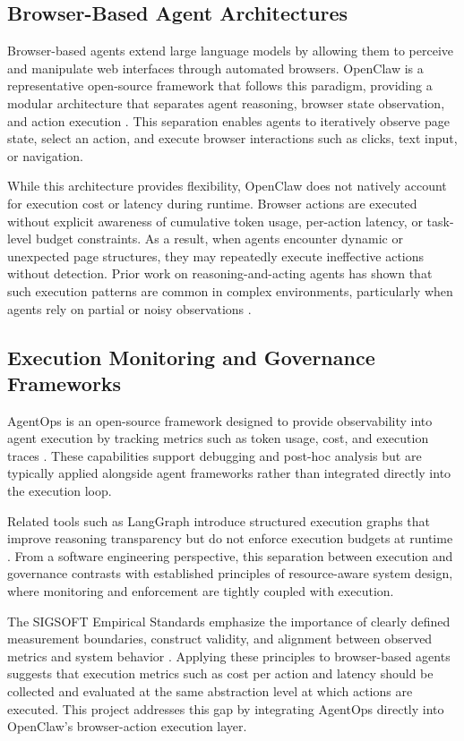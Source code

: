 \documentclass[conference]{IEEEtran}
\begin{document}
\subsection{Browser-Based Agent Architectures}

Browser-based agents extend large language models by allowing them to perceive and manipulate web interfaces through automated browsers. OpenClaw is a representative open-source framework that follows this paradigm, providing a modular architecture that separates agent reasoning, browser state observation, and action execution \cite{openclaw}. This separation enables agents to iteratively observe page state, select an action, and execute browser interactions such as clicks, text input, or navigation.

While this architecture provides flexibility, OpenClaw does not natively account for execution cost or latency during runtime. Browser actions are executed without explicit awareness of cumulative token usage, per-action latency, or task-level budget constraints. As a result, when agents encounter dynamic or unexpected page structures, they may repeatedly execute ineffective actions without detection. Prior work on reasoning-and-acting agents has shown that such execution patterns are common in complex environments, particularly when agents rely on partial or noisy observations \cite{yao2022react}.

\subsection{Execution Monitoring and Governance Frameworks}

AgentOps is an open-source framework designed to provide observability into agent execution by tracking metrics such as token usage, cost, and execution traces \cite{agentops}. These capabilities support debugging and post-hoc analysis but are typically applied alongside agent frameworks rather than integrated directly into the execution loop.

Related tools such as LangGraph introduce structured execution graphs that improve reasoning transparency but do not enforce execution budgets at runtime \cite{langgraph}. From a software engineering perspective, this separation between execution and governance contrasts with established principles of resource-aware system design, where monitoring and enforcement are tightly coupled with execution.

The SIGSOFT Empirical Standards emphasize the importance of clearly defined measurement boundaries, construct validity, and alignment between observed metrics and system behavior \cite{sigsoft2020standards}. Applying these principles to browser-based agents suggests that execution metrics such as cost per action and latency should be collected and evaluated at the same abstraction level at which actions are executed. This project addresses this gap by integrating AgentOps directly into OpenClaw’s browser-action execution layer.
\end{document}
